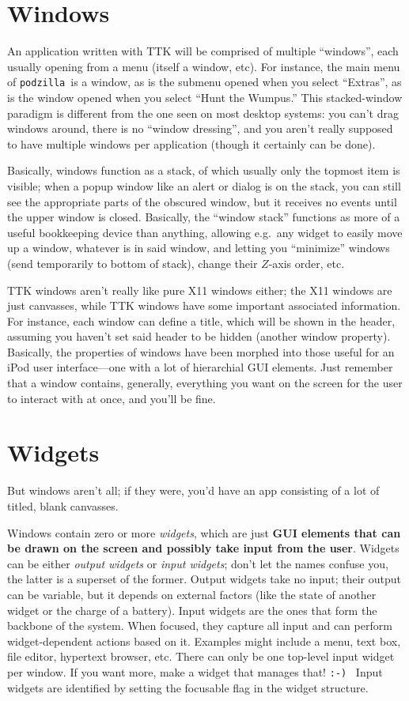 \documentclass[12pt,letterpaper]{report}
\def\pz{\texttt{podzilla}}
\let\ttt\tt
\def\tt{\def\_{{\ttt\char`\_}}\ttt}
\def\texttt#1{{\tt #1}}
\begin{document}
\section{Windows}
An application written with TTK will be comprised of multiple ``windows'', each usually
opening from a menu (itself a window, etc). For instance, the main menu of \pz\ is a window,
as is the submenu opened when you select ``Extras'', as is the window opened when you select
``Hunt the Wumpus.'' This stacked-window paradigm is different from the one seen on most
desktop systems: you can't drag windows around, there is no ``window dressing'', and you aren't
really supposed to have multiple windows per application (though it certainly can be done).

Basically, windows function as a stack, of which usually only the topmost item is visible;
when a popup window like an alert or dialog is on the stack, you can still see the appropriate
parts of the obscured window, but it receives no events until the upper window is closed.
Basically, the ``window stack'' functions as more of a useful bookkeeping device than anything,
allowing e.g.~any widget to easily move up a window, whatever is in said window, and letting
you ``minimize'' windows (send temporarily to bottom of stack), change their $Z$-axis order, etc.

TTK windows aren't really like pure X11 windows either; the X11 windows are just canvasses, while
TTK windows have some important associated information. For instance, each window can define a
title, which will be shown in the header, assuming you haven't set said header to be hidden (another
window property). Basically, the properties of windows have been morphed into those useful for
an iPod user interface---one with a lot of hierarchial GUI elements. Just remember that
a window contains, generally, everything you want on the screen for the user to interact with
at once, and you'll be fine.

\section{Widgets}
But windows aren't all; if they were, you'd have an app consisting of a lot of titled, blank canvasses.

Windows contain zero or more {\sl widgets}, which are just
{\bf GUI elements that can be drawn on the screen and possibly take input from the user}.
Widgets can be either {\sl output widgets} or {\sl input widgets}; don't let the names confuse you,
the latter is a superset of the former. Output widgets take no input; their output can be
variable, but it depends on external factors (like the state of another widget or the charge of a battery).
Input widgets are the ones that form the backbone of the system.
When focused, they capture all input and can perform widget-dependent
actions based on it. Examples might include a menu, text box,
file editor, hypertext browser, etc. There can only be one top-level
input widget per window. If you want more, make a widget that manages
that! \texttt{:-)} \ Input widgets are identified by setting the {\sf focusable}
flag in the widget structure.
\end{document}
